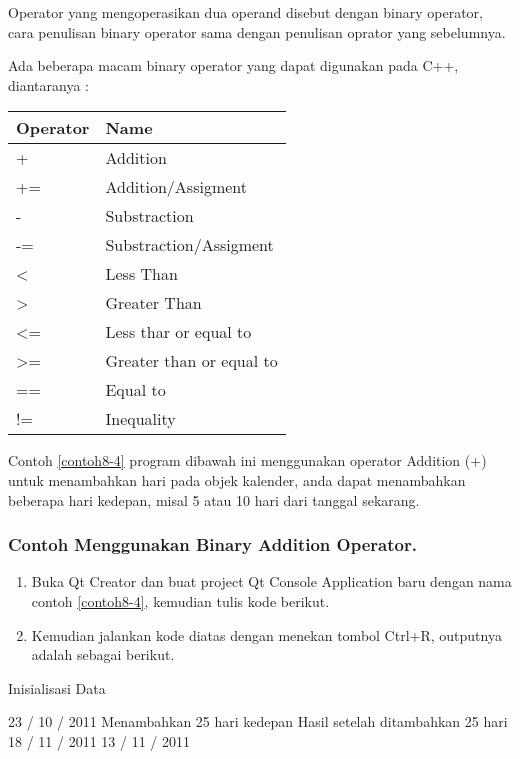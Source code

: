 Operator yang mengoperasikan dua operand disebut dengan binary operator,
cara penulisan binary operator sama dengan penulisan oprator yang
sebelumnya.



Ada beberapa macam binary operator yang dapat digunakan pada C++,
diantaranya :

\begin{longtable}[]{@{}ll@{}}
\toprule
Operator & Name\tabularnewline
\midrule
\endhead
+ & Addition\tabularnewline
+= & Addition/Assigment\tabularnewline
- & Substraction\tabularnewline
-= & Substraction/Assigment\tabularnewline
\textless{} & Less Than\tabularnewline
\textgreater{} & Greater Than\tabularnewline
\textless{}= & Less thar or equal to\tabularnewline
\textgreater{}= & Greater than or equal to\tabularnewline
== & Equal to\tabularnewline
!= & Inequality\tabularnewline
\bottomrule
\end{longtable}

Contoh \ref{contoh8-4} program dibawah ini menggunakan operator Addition (+) untuk
menambahkan hari pada objek kalender, anda dapat menambahkan beberapa
hari kedepan, misal 5 atau 10 hari dari tanggal sekarang.

\subsubsection*{Contoh  Menggunakan Binary Addition Operator.}

\begin{enumerate}

\item
  Buka Qt Creator dan buat project Qt Console Application baru dengan
  nama contoh \ref{contoh8-4}, kemudian tulis kode berikut.



\item
  Kemudian jalankan kode diatas dengan menekan tombol Ctrl+R, outputnya
  adalah sebagai berikut.
\end{enumerate}

\begin{lcverbatim}
Inisialisasi Data

23 / 10 / 2011 Menambahkan 25 hari kedepan
Hasil setelah ditambahkan 25 hari 18 / 11 / 2011 
13 / 11 / 2011
\end{lcverbatim}

